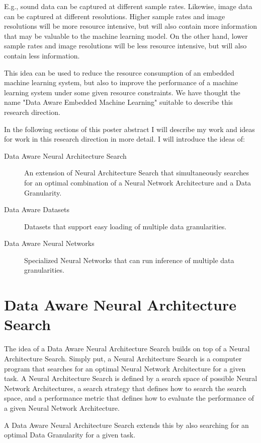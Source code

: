 \documentclass{acaces}
\begin{document}
E.g., sound data can be captured at different sample rates.
Likewise, image data can be captured at different resolutions.
Higher sample rates and image resolutions will be more resource intensive, but will also contain more information that may be valuable to the machine learning model.
On the other hand, lower sample rates and image resolutions will be less resource intensive, but will also contain less information.

This idea can be used to reduce the resource consumption of an embedded machine learning system, but also to improve the performance of a machine learning system under some given resource constraints.
We have thought the name "Data Aware Embedded Machine Learning" suitable to describe this research direction.

In the following sections of this poster abstract I will describe my work and ideas for work in this research direction in more detail.
I will introduce the ideas of:
\begin{description}
    \item[Data Aware Neural Architecture Search] An extension of Neural Architecture Search that simultaneously searches for an optimal combination of a Neural Network Architecture and a Data Granularity.
    \item[Data Aware Datasets] Datasets that support easy loading of multiple data granularities.
    \item[Data Aware Neural Networks] Specialized Neural Networks that can run inference of multiple data granularities.
\end{description}

\section{Data Aware Neural Architecture Search}
The idea of a Data Aware Neural Architecture Search builds on top of a Neural Architecture Search.
Simply put, a Neural Architecture Search is a computer program that searches for an optimal Neural Network Architecture for a given task.
A Neural Architecture Search is defined by a search space of possible Neural Network Architectures, a search strategy that defines how to search the search space, and a performance metric that defines how to evaluate the performance of a given Neural Network Architecture.

A Data Aware Neural Architecture Search extends this by also searching for an optimal Data Granularity for a given task.
\end{document}
